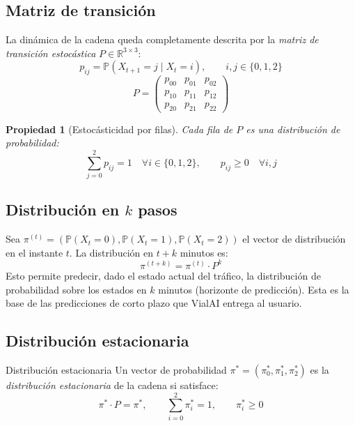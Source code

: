 \documentclass[11pt,a4paper]{article}
\newtheorem{propiedad}{Propiedad}
\begin{document}
\subsection{Matriz de transición}

La dinámica de la cadena queda completamente descrita por la \textit{matriz de transición estocástica} $P \in \mathbb{R}^{3 \times 3}$:
\begin{equation}
p_{ij} = \mathbb{P}(X_{t+1} = j \mid X_t = i), \qquad i, j \in \{0, 1, 2\}
\end{equation}
\begin{equation}
P = \begin{pmatrix}
p_{00} & p_{01} & p_{02} \\
p_{10} & p_{11} & p_{12} \\
p_{20} & p_{21} & p_{22}
\end{pmatrix}
\end{equation}

\begin{propiedad}[Estocásticidad por filas]
Cada fila de $P$ es una distribución de probabilidad:
\begin{equation}
\sum_{j=0}^{2} p_{ij} = 1 \quad \forall i \in \{0, 1, 2\}, \qquad p_{ij} \geq 0 \quad \forall i,j
\end{equation}
\end{propiedad}

\subsection{Distribución en $k$ pasos}

Sea $\pi^{(t)} = (\mathbb{P}(X_t = 0), \mathbb{P}(X_t = 1), \mathbb{P}(X_t = 2))$ el vector de distribución en el instante $t$. La distribución en $t + k$ minutos es:
\begin{equation}
\pi^{(t+k)} = \pi^{(t)} \cdot P^k
\label{eq:kpasos}
\end{equation}
Esto permite predecir, dado el estado actual del tráfico, la distribución de probabilidad sobre los estados en $k$ minutos (horizonte de predicción). Esta es la base de las predicciones de corto plazo que VialAI entrega al usuario.

\subsection{Distribución estacionaria}

\begin{defbox}{Distribución estacionaria}
Un vector de probabilidad $\pi^* = (\pi_0^*, \pi_1^*, \pi_2^*)$ es la \textit{distribución estacionaria} de la cadena si satisface:
\begin{equation}
\pi^* \cdot P = \pi^*, \qquad \sum_{i=0}^{2} \pi_i^* = 1, \qquad \pi_i^* \geq 0
\label{eq:estacionaria}
\end{equation}
\end{defbox}
\end{document}
